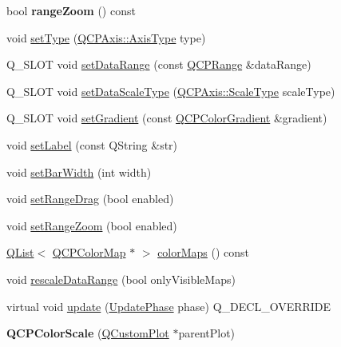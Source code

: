 \begin{DoxyCompactItemize}
\item 
bool {\bfseries range\+Zoom} () const \hypertarget{class_q_c_p_color_scale_a1123986a10acda3cdc371e4d97b3326c}{}\label{class_q_c_p_color_scale_a1123986a10acda3cdc371e4d97b3326c}

\item 
void \hyperlink{class_q_c_p_color_scale_a1bf9bdb291927c422dd66b404b206f1f}{set\+Type} (\hyperlink{class_q_c_p_axis_ae2bcc1728b382f10f064612b368bc18a}{Q\+C\+P\+Axis\+::\+Axis\+Type} type)
\item 
Q\+\_\+\+S\+L\+OT void \hyperlink{class_q_c_p_color_scale_abe88633003a26d1e756aa74984587fef}{set\+Data\+Range} (const \hyperlink{class_q_c_p_range}{Q\+C\+P\+Range} \&data\+Range)
\item 
Q\+\_\+\+S\+L\+OT void \hyperlink{class_q_c_p_color_scale_aeb6107d67dd7325145b2498abae67fc3}{set\+Data\+Scale\+Type} (\hyperlink{class_q_c_p_axis_a36d8e8658dbaa179bf2aeb973db2d6f0}{Q\+C\+P\+Axis\+::\+Scale\+Type} scale\+Type)
\item 
Q\+\_\+\+S\+L\+OT void \hyperlink{class_q_c_p_color_scale_a1f29583bb6f1e7f473b62fb712be3940}{set\+Gradient} (const \hyperlink{class_q_c_p_color_gradient}{Q\+C\+P\+Color\+Gradient} \&gradient)
\item 
void \hyperlink{class_q_c_p_color_scale_aee124ae8396320cacf8276e9a0fbb8ce}{set\+Label} (const Q\+String \&str)
\item 
void \hyperlink{class_q_c_p_color_scale_ab9dcc0c1cd583477496209b1413bcb99}{set\+Bar\+Width} (int width)
\item 
void \hyperlink{class_q_c_p_color_scale_a21c51a55e4fd581b6feadca9ee5b38d5}{set\+Range\+Drag} (bool enabled)
\item 
void \hyperlink{class_q_c_p_color_scale_a96bd60fb6317ad6821841b539c93eeeb}{set\+Range\+Zoom} (bool enabled)
\item 
\hyperlink{class_q_list}{Q\+List}$<$ \hyperlink{class_q_c_p_color_map}{Q\+C\+P\+Color\+Map} $\ast$ $>$ \hyperlink{class_q_c_p_color_scale_a01bb96981614f2556ef7da04531a7a05}{color\+Maps} () const 
\item 
void \hyperlink{class_q_c_p_color_scale_a425983db4478543924ddbd04ea20a356}{rescale\+Data\+Range} (bool only\+Visible\+Maps)
\item 
virtual void \hyperlink{class_q_c_p_color_scale_a259dcb6d3053a2cc3c197e9b1191ddbe}{update} (\hyperlink{class_q_c_p_layout_element_a0d83360e05735735aaf6d7983c56374d}{Update\+Phase} phase) Q\+\_\+\+D\+E\+C\+L\+\_\+\+O\+V\+E\+R\+R\+I\+DE
\item 
{\bfseries Q\+C\+P\+Color\+Scale} (\hyperlink{class_q_custom_plot}{Q\+Custom\+Plot} $\ast$parent\+Plot)\hypertarget{class_q_c_p_color_scale_aa8debce1be38b54287c04d4f584394b4}{}\label{class_q_c_p_color_scale_aa8debce1be38b54287c04d4f584394b4}


\end{DoxyCompactItemize}
